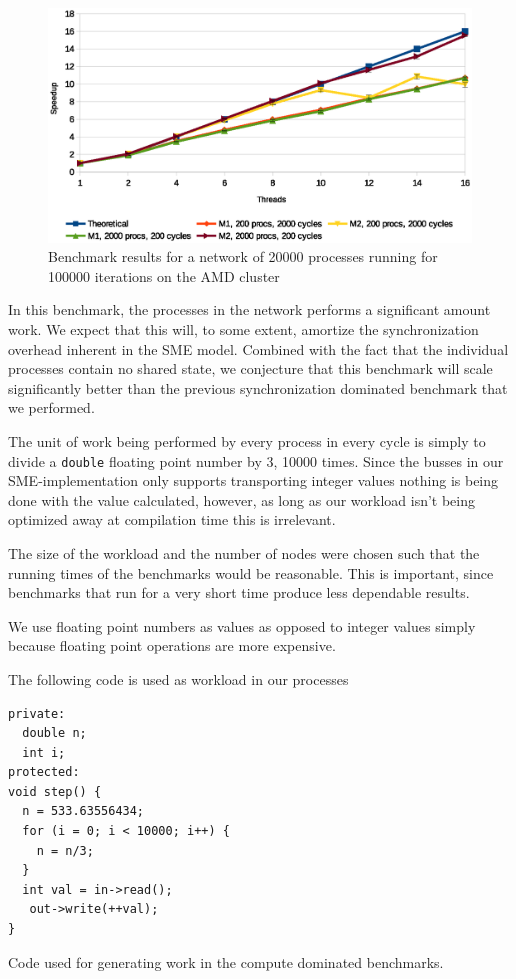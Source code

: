 \begin{figure}
\centering
\includegraphics[width=\textwidth]{graphs/heavy-ring2}
\caption[Compute dominated benchmark on AMD cluster]{Benchmark results for a network of 20000 processes running
for 100000 iterations on the AMD cluster}
\label{fig:heavy-ring}
\end{figure}


In this benchmark, the processes in the network performs a significant
amount work. We expect that this will, to some extent, amortize the
synchronization overhead inherent in the SME model. Combined with the
fact that the individual processes contain no shared state, we
conjecture that this benchmark will scale significantly better
than the previous synchronization dominated benchmark that we
performed.

The unit of work being performed by every process in every cycle is
simply to divide a \texttt{double} floating point number by 3, 10000
times. Since the busses in our SME-implementation only supports
transporting integer values nothing is being done with the value calculated,
however, as long as our workload isn't being optimized away at compilation
time this is irrelevant.

The size of the workload and the number of nodes were chosen such that
the running times of the benchmarks would be reasonable. This is
important, since benchmarks that run for a very short time produce
less dependable results.

We use floating point numbers as values as opposed to integer values
simply because floating point operations are more expensive.

The following code is used as workload in our processes

\begin{listing}[H]
\begin{verbatim}
private:
  double n;
  int i;
protected:
void step() {
  n = 533.63556434;
  for (i = 0; i < 10000; i++) {
    n = n/3;
  }
  int val = in->read();
   out->write(++val);
}
\end{verbatim}
\caption{Code used for generating work in the compute dominated
  benchmarks.}
\label{lst:cyclecode}
\end{listing}


